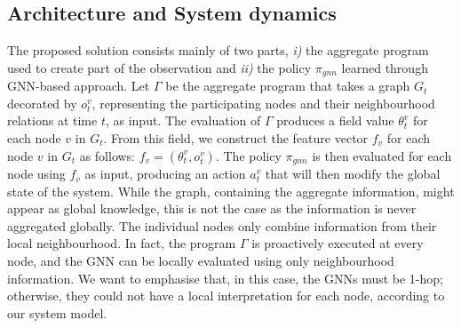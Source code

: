 \documentclass[conference]{IEEEtran}
\begin{document}
\subsection{Architecture and System dynamics}
The proposed solution consists mainly of two parts, 
\emph{i)} the aggregate program used to create part of the observation and 
\emph{ii)} the policy $\pi_{gnn}$ learned through \ac{GNN}-based approach. 
%
Let $\Gamma$ be the aggregate program that takes a graph $G_t$ decorated by $o^v_t$, 
 representing the participating nodes and their neighbourhood relations at time $t$, as input. 
%
The evaluation of $\Gamma$ produces a field value $\theta^v_t$ for each node $v$ in $G_t$. 
From this field, we construct the feature vector $f_v$ for each node $v$ in $G_t$ as follows:
 $f_v = (\theta^v_t, o^v_t)$.
%
The policy $\pi_{gnn}$ is then evaluated for each node using $f_v$ as input, 
 producing an action $a^v_t$ that will then modify the global state of the system.
%
While the graph, containing the aggregate information, 
 might appear as global knowledge, 
 this is not the case as the information is never aggregated globally. 
The individual nodes only combine information from their local neighbourhood.
%
In fact, the program $\Gamma$ is proactively executed at every node, 
and the \ac{GNN} can be locally evaluated using only neighbourhood information. 
%
We want to emphasise that, in this case, the \acp{GNN} must be 1-hop; 
otherwise, they could not have a local interpretation for each node, according to our system model.
\end{document}

